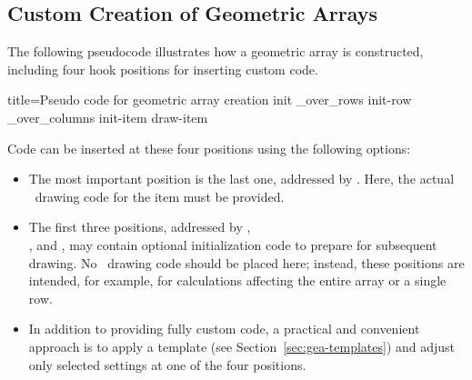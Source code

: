 \documentclass[a4paper,11pt]{article}
\begin{document}
\clearpage


\subsection{Custom Creation of Geometric Arrays}

The following pseudocode illustrates how a geometric array is constructed,
including four hook positions for inserting custom code.

\begin{dispListing*}{title=Pseudo code for geometric array creation}
init                    %
\loop_over_rows
  {
    init-row            %
    \loop_over_columns
      {
        init-item       %
        draw-item       %
      }
  }
\end{dispListing*}

Code can be inserted at these four positions using the following options:
\begin{itemize}
\item
  The most important position is the last one, addressed by
  . Here, the actual \tikzname\ drawing code for
  the item must be provided.
\item
  The first three positions, addressed by
  ,\\
  , and ,
  may contain optional initialization code to prepare for subsequent drawing.
  No \tikzname\ drawing code should be placed here; instead, these positions are
  intended, for example, for calculations affecting the entire array or a single
  row.
\item
  In addition to providing fully custom code, a practical and convenient approach
  is to apply a template (see Section~\ref{sec:gea-templates}) and adjust only
  selected settings at one of the four positions.
\end{itemize}
\end{document}
